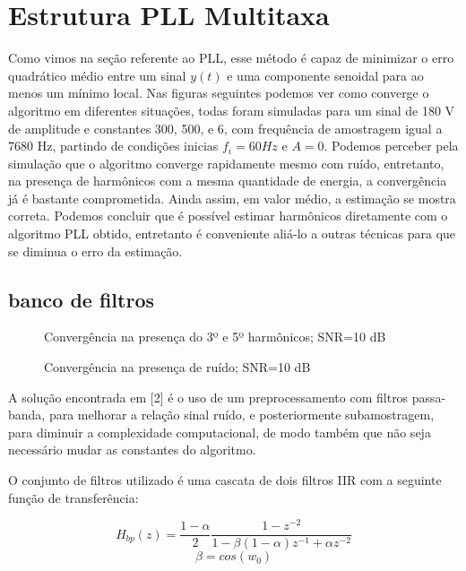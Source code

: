 \documentclass[a4paper, 12pt]{book}
\begin{document}
	
\section{Estrutura PLL Multitaxa}
	
Como vimos na seção referente ao PLL, esse método é capaz de minimizar o erro quadrático médio entre um sinal $y(t)$ e uma componente senoidal para ao menos um mínimo local. Nas figuras seguintes podemos ver como converge o algoritmo em diferentes situações, todas foram simuladas para um sinal de 180 V de amplitude e constantes 300, 500, e 6, com frequência de amostragem igual a 7680 Hz, partindo de condições inicias $f_i=60 Hz$ e $A=0$. Podemos perceber pela simulação que o algoritmo converge rapidamente mesmo com ruído, entretanto, na presença de harmônicos com a mesma quantidade de energia, a convergência já é bastante comprometida. Ainda assim, em valor médio, a estimação se mostra correta. Podemos concluir que é possível estimar harmônicos diretamente com o algoritmo PLL obtido, entretanto é conveniente aliá-lo a outras técnicas para que se diminua o erro da estimação.

\subsection{banco de filtros}

\begin{figure}[h]
	\centering    
	\def\svgwidth{\columnwidth}
	
	\caption{Convergência na presença do 3º e 5º harmônicos; SNR=10 dB}
	\label{fig:your image label}
\end{figure}

\begin{figure}[h]
	\centering    
	\def\svgwidth{\columnwidth}
	
	\caption{Convergência na presença de ruído; SNR=10 dB}
	\label{fig:your image label}
\end{figure}

\indent A solução encontrada em [2] é o uso de um preprocessamento com filtros passa-banda, para melhorar a relação sinal ruído, e posteriormente subamostragem, para diminuir a complexidade computacional, de modo também que não seja necessário mudar as constantes do algoritmo.

\indent O conjunto de filtros utilizado é uma cascata de dois filtros IIR com a seguinte função de transferência:

\begin{equation}
H_{bp}(z)=\frac{1-\alpha}{2}\frac{1-z^{-2}}{1-\beta (1-\alpha) z^{-1} + \alpha z^{-2}}
\label{eq:filtro}
\end{equation}
\begin{equation}
\beta=cos(w_0)
\label{eq:w0 filtro}
\end{equation}
\end{document}
